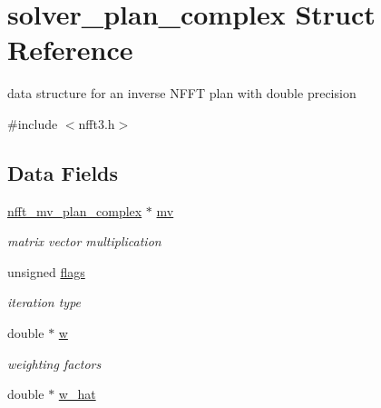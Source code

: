 \hypertarget{structsolver__plan__complex}{\section{solver\-\_\-plan\-\_\-complex Struct Reference}
\label{structsolver__plan__complex}
}


data structure for an inverse N\-F\-F\-T plan with double precision  




{\ttfamily \#include $<$nfft3.\-h$>$}

\subsection*{Data Fields}
\begin{DoxyCompactItemize}
\item 
\hypertarget{structsolver__plan__complex_afc0da6d097e04c2e28302a3b749140e7}{\hyperlink{structnfft__mv__plan__complex}{nfft\-\_\-mv\-\_\-plan\-\_\-complex} $\ast$ \hyperlink{structsolver__plan__complex_afc0da6d097e04c2e28302a3b749140e7}{mv}}\label{structsolver__plan__complex_afc0da6d097e04c2e28302a3b749140e7}

\begin{DoxyCompactList}\small\item\em matrix vector multiplication \end{DoxyCompactList}\item 
\hypertarget{structsolver__plan__complex_a5423b6885c0bd94b563c8cfd9370c942}{unsigned \hyperlink{structsolver__plan__complex_a5423b6885c0bd94b563c8cfd9370c942}{flags}}\label{structsolver__plan__complex_a5423b6885c0bd94b563c8cfd9370c942}

\begin{DoxyCompactList}\small\item\em iteration type \end{DoxyCompactList}\item 
\hypertarget{structsolver__plan__complex_a3bb04f250f17c2a4ab5d0b813b7ccf2c}{double $\ast$ \hyperlink{structsolver__plan__complex_a3bb04f250f17c2a4ab5d0b813b7ccf2c}{w}}\label{structsolver__plan__complex_a3bb04f250f17c2a4ab5d0b813b7ccf2c}

\begin{DoxyCompactList}\small\item\em weighting factors \end{DoxyCompactList}\item 
\hypertarget{structsolver__plan__complex_a80a69f8b5ddbd33be7041e6c6b0758ce}{double $\ast$ \hyperlink{structsolver__plan__complex_a80a69f8b5ddbd33be7041e6c6b0758ce}{w\-\_\-hat}}\label{structsolver__plan__complex_a80a69f8b5ddbd33be7041e6c6b0758ce}


\end{DoxyCompactItemize}
